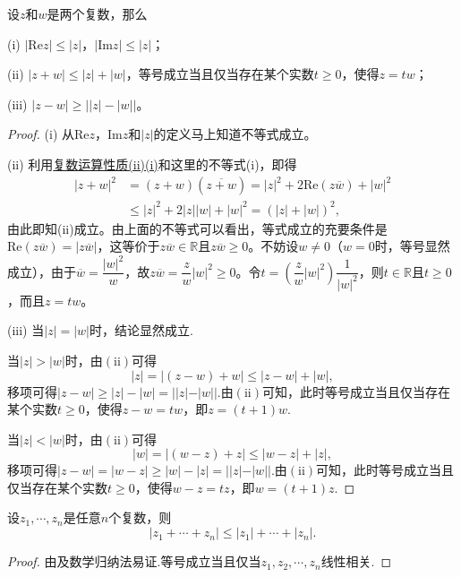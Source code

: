 \documentclass[../../main.tex]{subfiles}
\begin{document}
\begin{proposition}\label{proposition:复数基本不等式}
设\(z\)和\(w\)是两个复数，那么

(i) \(|\mathrm{Re}z| \leqslant |z|\)，\(|\mathrm{Im}z| \leqslant |z|\)；

(ii) \(|z + w| \leqslant |z| + |w|\)，等号成立当且仅当存在某个实数\(t \geqslant 0\)，使得\(z = tw\)；

(iii) \(|z - w| \geqslant \big||z| - |w|\big|\)。
\end{proposition}
\begin{proof}
(i) 从\(\mathrm{Re}z\)，\(\mathrm{Im}z\)和\(|z|\)的定义马上知道不等式成立。

(ii) 利用\hyperref[proposition:复数运算性质]{复数运算性质(ii)(i)}和这里的不等式(i)，即得
\[
\begin{split}
|z + w|^2 &= (z + w)(\overline{z + w}) = |z|^2 + 2\mathrm{Re}(z\overline{w}) + |w|^2 \\
& \leqslant |z|^2 + 2|z||w| + |w|^2 = (|z| + |w|)^2,
\end{split}
\]
由此即知(ii)成立。由上面的不等式可以看出，等式成立的充要条件是\(\mathrm{Re}(z\overline{w}) = |z\overline{w}|\)，这等价于$z\overline{w}\in \mathbb{R}$且\(z\overline{w} \geqslant 0\)。不妨设\(w \neq 0\)（\(w = 0\)时，等号显然成立），由于\(\overline{w} = \dfrac{|w|^2}{w}\)，故\(z\overline{w}=\dfrac{z}{w}|w|^2 \geqslant 0\)。令\(t = \left( \dfrac{z}{w}|w|^2 \right) \dfrac{1}{|w|^2}\)，则$t\in \mathbb{R}$且\(t \geqslant 0\)，而且\(z = tw\)。

(iii) 当\(| z | = | w |\)时，结论显然成立.

当\(| z | > | w |\)时，由\((\mathrm{ii})\)可得
\[| z | = | (z - w) + w | \leqslant | z - w | + | w |,\]
移项可得\(| z - w | \geqslant | z | - | w | = | | z | - | w | |\).由\((\mathrm{ii})\)可知，此时等号成立当且仅当存在某个实数\(t \geqslant 0\)，使得\(z - w = tw\)，即\(z = (t + 1)w\).

当\(| z | < | w |\)时，由\((\mathrm{ii})\)可得
\[| w | = | (w - z) + z | \leqslant | w - z | + | z |,\]
移项可得\(| z - w | = | w - z | \geqslant | w | - | z | = | | z | - | w | |\).由\((\mathrm{ii})\)可知，此时等号成立当且仅当存在某个实数\(t \geqslant 0\)，使得\(w - z = tz\)，即\(w = (t + 1)z\).

\end{proof}

\begin{corollary}
设\(z_1, \cdots, z_n\)是任意\(n\)个复数，则
\[
|z_1 + \cdots + z_n| \leqslant |z_1| + \cdots + |z_n|.
\]
\end{corollary}
\begin{proof}
由及数学归纳法易证.等号成立当且仅当$z_1,z_2,\cdots,z_n$线性相关.

\end{proof}
\end{document}
